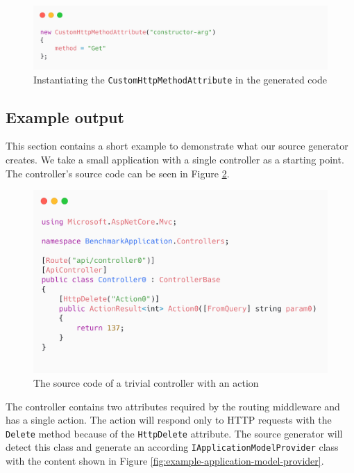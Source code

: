 \begin{figure}[H]
\centering
\includegraphics[width=1\textwidth]{graphics/custom-attribute-creation.png}
\caption{Instantiating the \texttt{CustomHttpMethodAttribute} in the generated code}
\label{fig:custom-attribute-creation}
\end{figure}

\subsection{Example output}

This section contains a short example to demonstrate what our source generator creates. We take a small application with a single controller as a starting point. The controller's source code can be seen in Figure \ref{fig:example-controller}.

\begin{figure}[H]
\centering
\includegraphics[width=1\textwidth]{graphics/example-controller.png}
\caption{The source code of a trivial controller with an action}
\label{fig:example-controller}
\end{figure}

The controller contains two attributes required by the routing middleware and has a single action. The action will respond only to HTTP requests with the \texttt{Delete} method because of the \texttt{HttpDelete} attribute. The source generator will detect this class and generate an according \texttt{IApplicationModelProvider} class with the content shown in Figure \ref{fig:example-application-model-provider}.

